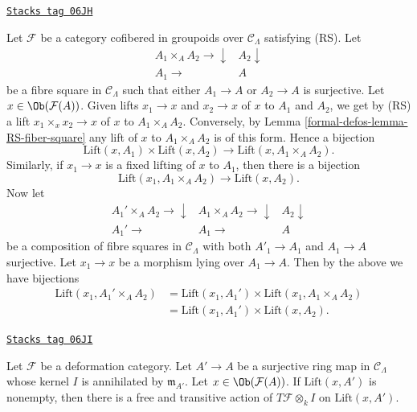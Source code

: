 \begin{remark}
\label{formal-defos-remark-lift-bijections}
\href{https://stacks.math.columbia.edu/tag/06JH}{\texttt{Stacks tag 06JH}}

Let $\mathcal{F}$ be a category cofibered in groupoids over $\mathcal
C_\Lambda$ satisfying (RS).  Let
$$
\begin{array}{cc}A_1 \times_A A_2 \longrightarrow\downarrow & A_2 \downarrow \\ A_1 \longrightarrow & A\end{array}
$$
be a fibre square in $\mathcal{C}_\Lambda$ such that either
$A_1 \to A$ or $A_2 \to A$ is surjective. Let
$x \in \Ob(\mathcal{F}(A))$. Given
lifts $x_1 \to x$ and $x_2 \to x$ of $x$ to $A_1$ and $A_2$, we get by
(RS) a lift $x_1 \times_x x_2 \to x$ of $x$ to $A_1 \times_A A_2$.
Conversely, by
Lemma \ref{formal-defos-lemma-RS-fiber-square}
any lift of $x$ to $A_1 \times_A A_2$ is of this form.
Hence a bijection
$$
\text{Lift}(x, A_1) \times \text{Lift}(x, A_2)
\longrightarrow
\text{Lift}(x, A_1 \times_A A_2).
$$
Similarly, if $x_1 \to x$ is a fixed lifting of $x$ to $A_1$, then
there is a bijection
$$
\text{Lift}(x_1, A_1 \times_A A_2)
\longrightarrow
\text{Lift}(x, A_2).
$$
Now let
$$
\begin{array}{ccc}A_1' \times_A A_2 \longrightarrow\downarrow & A_1 \times_A A_2 \longrightarrow\downarrow & A_2
\downarrow \\ A_1' \longrightarrow & A_1 \longrightarrow & A\end{array}
$$
be a composition of fibre squares in $\mathcal{C}_\Lambda$ with
both $A'_1 \to A_1$ and $A_1 \to A$ surjective. Let $x_1 \to x$ be a morphism
lying over $A_1 \to A$. Then by the above we have bijections
\begin{align*}
\text{Lift}(x_1, A_1' \times_A A_2)
& = \text{Lift}(x_1, A_1') \times \text{Lift}(x_1, A_1 \times_A A_2) \\
& = \text{Lift}(x_1, A_1') \times \text{Lift}(x, A_2).
\end{align*}
\end{remark}

\begin{lemma}
\label{formal-defos-lemma-free-transitive-action}
\href{https://stacks.math.columbia.edu/tag/06JI}{\texttt{Stacks tag 06JI}}

Let $\mathcal{F}$ be a deformation category.
Let $A' \to A$ be a surjective ring map in
$\mathcal{C}_\Lambda$ whose kernel $I$ is annihilated
by $\mathfrak m_{A'}$. Let $x \in \Ob(\mathcal{F}(A))$.
If $\text{Lift}(x, A')$ is nonempty,
then there is a free and transitive action of
$T\mathcal{F} \otimes_k I$ on $\text{Lift}(x, A')$.
\end{lemma}

